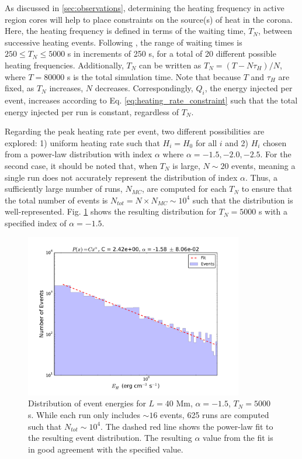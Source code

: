 %
\par As discussed in \ref{sec:observations}, determining the heating frequency in active region cores will help to place constraints on the source(s) of heat in the corona. Here, the heating frequency is defined in terms of the waiting time, $T_N$, between successive heating events. Following \citet{cargill_active_2014}, the range of waiting times is $250\le T_N\le5000$ s in increments of 250 s, for a total of 20 different possible heating frequencies. Additionally, $T_N$ can be written as $T_N=(T-N\tau_H)/N$, where $T=80000$ s is the total simulation time. Note that because $T$ and $\tau_H$ are fixed, as $T_N$ increases, $N$ decreases. Correspondingly, $Q_i$, the energy injected per event, increases according to Eq. \ref{eq:heating_rate_constraint} such that the total energy injected per run is constant, regardless of $T_N$.
%
\par Regarding the peak heating rate per event, two different possibilities are explored: 1) uniform heating rate such that $H_i=H_0$ for all $i$ and 2) $H_i$ chosen from a power-law distribution with index $\alpha$ where $\alpha=-1.5,-2.0,-2.5$. For the second case, it should be noted that, when $T_N$ is large, $N\sim20$ events, meaning a single run does not accurately represent the distribution of index $\alpha$. Thus, a sufficiently large number of runs, $N_{MC}$, are computed for each $T_N$ to ensure that the total number of events is $N_{tot}=N\times N_{MC}\sim10^4$ such that the distribution is well-represented. Fig. \ref{fig:event_dist} shows the resulting distribution for $T_N=5000$ s with a specified index of $\alpha=-1.5$.  
%
\begin{figure}
	\centering
	\includegraphics[width=0.85\textwidth]{figures/event_dist.pdf}
	\caption{Distribution of event energies for $L=40$ Mm, $\alpha=-1.5$, $T_N=5000$ s. While each run only includes $\sim16$ events, 625 runs are computed such that $N_{tot}\sim10^4$. The dashed red line shows the power-law fit to the resulting event distribution. The resulting $\alpha$ value from the fit is in good agreement with the specified value.}
	\label{fig:event_dist}
\end{figure}
